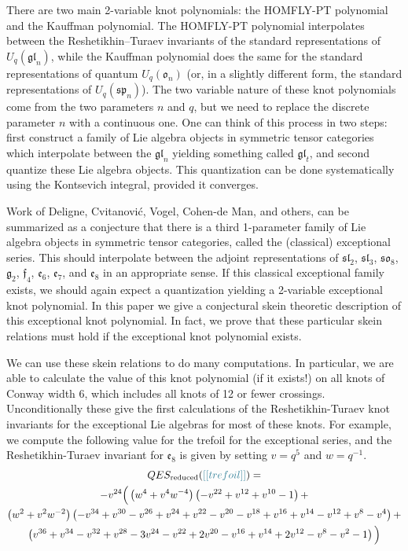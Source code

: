 \documentclass[12pt]{amsart}
\begin{document}
There are two main 2-variable knot polynomials: the HOMFLY-PT polynomial and
the Kauffman polynomial.  The HOMFLY-PT polynomial interpolates between the
Reshetikhin--Turaev invariants of the standard representations of
$U_q(\mathfrak{gl}_n)$, while the Kauffman polynomial does the same for the
standard representations of quantum $U_q(\mathfrak{o}_n)$ (or, in a slightly
different form, the standard representations of $U_q(\mathfrak{sp}_n)$).  The
two variable nature of these knot polynomials come from the two parameters $n$
and $q$, but we need to replace the discrete parameter $n$ with a continuous
one.   One can think of this process in two steps: first construct a family of
Lie algebra objects in symmetric tensor categories which interpolate between
the $\mathfrak{gl}_n$ yielding something called $\mathfrak{gl}_t$, and second
quantize these Lie algebra objects.   This quantization can be done
systematically using the Kontsevich integral, provided it converges.

Work of Deligne, Cvitanović, Vogel, Cohen-de Man, and others, can be
summarized as a conjecture that there is a third 1-parameter family of Lie
algebra objects in symmetric tensor categories, called the (classical)
exceptional series. This should interpolate between the adjoint
representations of $\mathfrak{sl}_2$, $\mathfrak{sl}_3$, $\mathfrak{so}_8$,
$\mathfrak{g}_2$, $\mathfrak{f}_4$, $\mathfrak{e}_6$, $\mathfrak{e}_7$, and
$\mathfrak{e}_8$ in an appropriate sense.  If this classical exceptional
family exists, we should again expect a quantization yielding a 2-variable
exceptional knot polynomial.  In this paper we give a conjectural skein
theoretic description of this exceptional knot polynomial. In fact, we prove
that these particular skein relations must hold if the exceptional knot
polynomial exists.

We can use these skein relations to do many computations.  In particular, we
are able to calculate the value of this knot polynomial (if it exists!) on all
knots of Conway width 6, which includes all knots of 12 or fewer crossings.
Unconditionally these give the first calculations of the Reshetikhin-Turaev
knot invariants for the exceptional Lie algebras for most of these knots.
  For
example, we compute the following value for the trefoil for the exceptional
series, and the Reshetikhin-Turaev invariant for $\mathfrak{e}_8$ is given by
setting $v=q^5$ and $w=q^{-1}$.
\begin{multline*}
QES_{\text{reduced}}(\nn{trefoil}) = \\
-v^{24}
\Big(
    \left(w^4 + v^4 w^{-4}\right)\left(-v^{22}+v^{12}+v^{10}-1\right)+\\
    \left(w^2 + v^2 w^{-2}\right)\left(-v^{34}+v^{30}-v^{26}+v^{24}+v^{22}-v^{20}-v^{18}+v^{16}+v^{14}-v^{12}+v^8-v^4\right)+\\
    \left(v^{36}+v^{34}-v^{32}+v^{28}-3 v^{24}-v^{22}+2 v^{20}-v^{16}+v^{14}+2 v^{12}-v^8-v^2-1\right)
    \Big)
\end{multline*}
\end{document}

